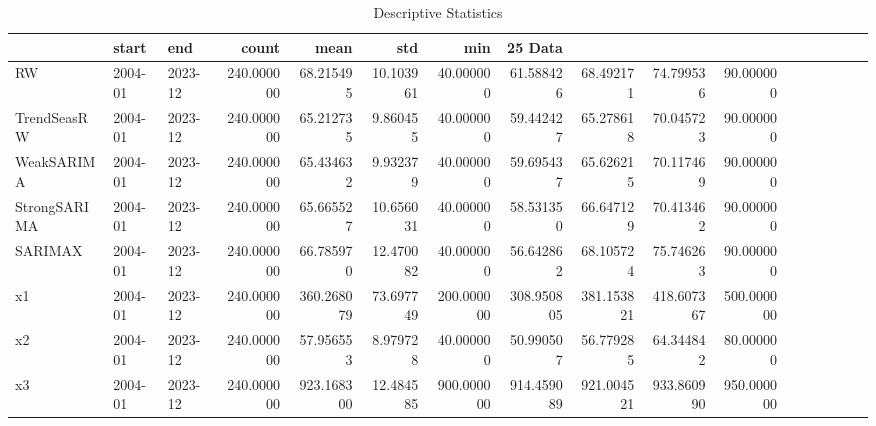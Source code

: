 \begin{table}
\caption{Descriptive Statistics}
\begin{tabular}{lllrrrrrrrr}
\toprule
 & start & end & count & mean & std & min & 25%
Data &  &  &  &  &  &  &  &  &  &  \\
\midrule
RW & 2004-01 & 2023-12 & 240.000000 & 68.215495 & 10.103961 & 40.000000 & 61.588426 & 68.492171 & 74.799536 & 90.000000 \\
TrendSeasRW & 2004-01 & 2023-12 & 240.000000 & 65.212735 & 9.860455 & 40.000000 & 59.442427 & 65.278618 & 70.045723 & 90.000000 \\
WeakSARIMA & 2004-01 & 2023-12 & 240.000000 & 65.434632 & 9.932379 & 40.000000 & 59.695437 & 65.626215 & 70.117469 & 90.000000 \\
StrongSARIMA & 2004-01 & 2023-12 & 240.000000 & 65.665527 & 10.656031 & 40.000000 & 58.531350 & 66.647129 & 70.413462 & 90.000000 \\
SARIMAX & 2004-01 & 2023-12 & 240.000000 & 66.785970 & 12.470082 & 40.000000 & 56.642862 & 68.105724 & 75.746263 & 90.000000 \\
x1 & 2004-01 & 2023-12 & 240.000000 & 360.268079 & 73.697749 & 200.000000 & 308.950805 & 381.153821 & 418.607367 & 500.000000 \\
x2 & 2004-01 & 2023-12 & 240.000000 & 57.956553 & 8.979728 & 40.000000 & 50.990507 & 56.779285 & 64.344842 & 80.000000 \\
x3 & 2004-01 & 2023-12 & 240.000000 & 923.168300 & 12.484585 & 900.000000 & 914.459089 & 921.004521 & 933.860990 & 950.000000 \\
\bottomrule
\end{tabular}
\end{table}
